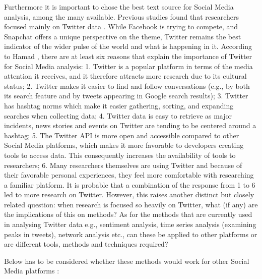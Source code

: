 \documentclass[b5paper,]{book}
\theoremstyle{definition}
\theoremstyle{definition}
\theoremstyle{definition}
\theoremstyle{remark}
\begin{document}
Furthermore it is important to chose the best text source for Social
Media analysis, among the many available. Previous studies found that
researchers focused mainly on Twitter data \citep{ossola2018}. While
Facebook is trying to compete, and Snapchat offers a unique perspective
on the theme, Twitter remains the best indicator of the wider pulse of
the world and what is happening in it. According to Hamad
\citep{ahmed2017using}, there are at least six reasons that explain the
importance of Twitter for Social Media analysis: 1. Twitter is a popular
platform in terms of the media attention it receives, and it therefore
attracts more research due to its cultural status; 2. Twitter makes it
easier to find and follow conversations (e.g., by both its search
feature and by tweets appearing in Google search results); 3. Twitter
has hashtag norms which make it easier gathering, sorting, and expanding
searches when collecting data; 4. Twitter data is easy to retrieve as
major incidents, news stories and events on Twitter are tending to be
centered around a hashtag; 5. The Twitter API is more open and
accessible compared to other Social Media platforms, which makes it more
favorable to developers creating tools to access data. This consequently
increases the availability of tools to researchers; 6. Many researchers
themselves are using Twitter and because of their favorable personal
experiences, they feel more comfortable with researching a familiar
platform. It is probable that a combination of the response from 1 to 6
led to more research on Twitter. However, this raises another distinct
but closely related question: when research is focused so heavily on
Twitter, what (if any) are the implications of this on methods? As for
the methods that are currently used in analysing Twitter data e.g.,
sentiment analysis, time series analysis (examining peaks in tweets),
network analysis etc., can these be applied to other platforms or are
different tools, methods and techniques required?

Below has to be considered whether these methods would work for other
Social Media platforms \citep{ahmed2017using}:
\end{document}
